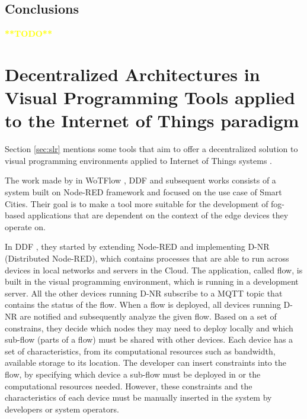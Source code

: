 \subsection{Conclusions}\label{sec:slr_conclusions}

\textcolor{yellow}{\textbf{**TODO**}}

\section{Decentralized Architectures in Visual Programming Tools applied to the Internet of Things paradigm}\label{sec:sota_decentralized}


Section \ref{sec:slr} mentions some tools that aim to offer a decentralized solution to visual programming environments applied to Internet of Things systems \cite{ddf} \cite{ddflow} \cite{wotflow_dnr}.
\par The work made by in WoTFlow \cite{wotflow_dnr}, DDF \cite{ddf} and subsequent works \cite{fog_at_the_edge} \cite{exogenous_coordination} consists of a system built on Node-RED framework and focused on the use case of Smart Cities. Their goal is to make a tool more suitable for the development of fog-based applications that are dependent on the context of the edge devices they operate on. 
\par In DDF \cite{ddf}, they started by extending Node-RED and implementing D-NR (Distributed Node-RED), which contains processes that are able to run across devices in local networks and servers in the Cloud. The application, called flow, is built in the visual programming environment, which is running in a development server. All the other devices running D-NR subscribe to a MQTT topic that contains the status of the flow. When a flow is deployed, all devices running D-NR are notified and subsequently analyze the given flow. Based on a set of constrains, they decide which nodes they may need to deploy locally and which sub-flow (parts of a flow) must be shared with other devices. Each device has a set of characteristics, from its computational resources such as bandwidth, available storage to its location. The developer can insert constraints into the flow, by specifying which device a sub-flow must be deployed in or the computational resources needed. However, these constraints and the characteristics of each device must be manually inserted in the system by developers or system operators. 
